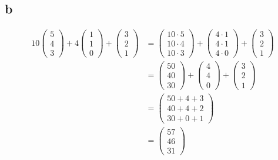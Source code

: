 \subsection{b}
\begin{align*}
  10\begin{pmatrix} 5 \\ 4 \\ 3 \end{pmatrix} + 4 \begin{pmatrix} 1 \\ 1 \\ 0 \end{pmatrix} + \begin{pmatrix} 3 \\ 2 \\ 1 \end{pmatrix}
  &= \begin{pmatrix} 10 \cdot 5 \\ 10 \cdot 4 \\ 10 \cdot 3 \end{pmatrix} + \begin{pmatrix} 4 \cdot 1 \\ 4 \cdot 1 \\ 4 \cdot 0 \end{pmatrix} + \begin{pmatrix} 3 \\ 2 \\ 1 \end{pmatrix} \\
  &= \begin{pmatrix} 50 \\ 40 \\ 30 \end{pmatrix} + \begin{pmatrix} 4 \\ 4 \\ 0 \end{pmatrix} + \begin{pmatrix} 3 \\ 2 \\ 1 \end{pmatrix} \\
  &= \begin{pmatrix} 50 + 4 + 3 \\ 40 + 4 + 2 \\ 30 + 0 + 1 \end{pmatrix} \\
  &= \begin{pmatrix} 57 \\ 46 \\ 31 \end{pmatrix}
\end{align*}

